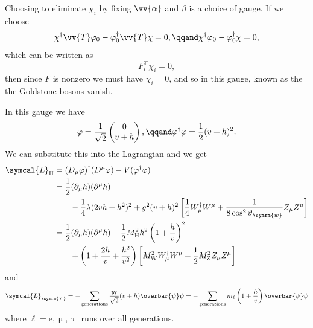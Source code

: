 \documentclass[fleqn]{NotesClass}
\newcommand{\Pparticle}[1]{\mathrm{#1}}
\newcommand{\Pex}{\ensuremath{\Pparticle{e}}}
\newcommand{\Pmux}{\ensuremath{\upmu}}
\newcommand{\Ptaux}{\ensuremath{\uptau}}
\newcommand{\PZ}{\ensuremath{\Pparticle{Z}}}
\newcommand{\PW}{\ensuremath{\Pparticle{W}}}
\newcommand{\Phiggs}{\ensuremath{\Pparticle{H}}}
\newcommand{\diracadjoint}[1]{\overbar{#1}}
\newcommand{\covariantDerivative}{D}
\newcommand{\hermit}{\dagger}
\newcommand{\lagrangianDensity}{\symcal{L}}
\newcommand{\trans}{\top}
\newcommand{\weinbergangle}{\vartheta_{\symrm{w}}}
\begin{document}
    Choosing to eliminate \(\chi_i\) by fixing \(\vv{\alpha}\) and \(\beta\) is a choice of gauge.
    If we choose
    \begin{equation}
        \chi^\hermit \vv{T} \varphi_0 - \varphi_0^\hermit \vv{T}\chi = 0, \qqand \chi^\hermit\varphi_0 - \varphi_0^\hermit \chi = 0,
    \end{equation}
    which can be written as
    \begin{equation}
        F_i^\trans \chi_i = 0,
    \end{equation}
    then since \(F\) is nonzero we must have \(\chi_i = 0\), and so in this gauge, known as the  the Goldstone bosons vanish.
    
    In this gauge we have
    \begin{equation}
        \varphi = \frac{1}{\sqrt{2}}
        \begin{pmatrix}
            0\\ v + h
        \end{pmatrix}
        , \qqand 
        \varphi^\hermit \varphi = \frac{1}{2}(v + h)^2.
    \end{equation}
    We can substitute this into the Lagrangian and we get
    \begin{align}
        \lagrangianDensity_{\Phiggs} &= (\covariantDerivative_\mu \varphi)^\hermit (\covariantDerivative^\mu \varphi) - V(\varphi^\hermit \varphi)\\
        &= \frac{1}{2}(\partial_\mu h)(\partial^\mu h)\\
        &\qquad - \frac{1}{4}\lambda(2vh + h^2)^2 + g^2(v + h)^2 \left[ \frac{1}{4}W_\mu^\hermit W^\mu + \frac{1}{8\cos^2\weinbergangle}Z_\mu Z^\mu \right] \notag\\
        &= \frac{1}{2}(\partial_\mu h)(\partial^\mu h) - \frac{1}{2}M_{\Phiggs}^2 h^2\left( 1 + \frac{h}{v} \right)^2\\
        &\qquad+ \left( 1 + \frac{2h}{v} + \frac{h^2}{v^2} \right)\left[ M_{\PW}^2W_\mu^\hermit W^\mu + \frac{1}{2}M_{\PZ}^2 Z_\mu Z^\mu \right] \notag
    \end{align}
    and
    \begin{equation}
        \lagrangianDensity_{\symrm{Y}} = -\sum_{\text{generations}} \frac{y_\ell}{\sqrt{2}}(v + h) \diracadjoint{\psi}\psi = -\sum_{\text{generations}} m_\ell\left( 1 + \frac{h}{v} \right)\diracadjoint{\psi}\psi
    \end{equation}
    where \(\ell = \Pex, \Pmux, \Ptaux\) runs over all generations.
    
\end{document}
